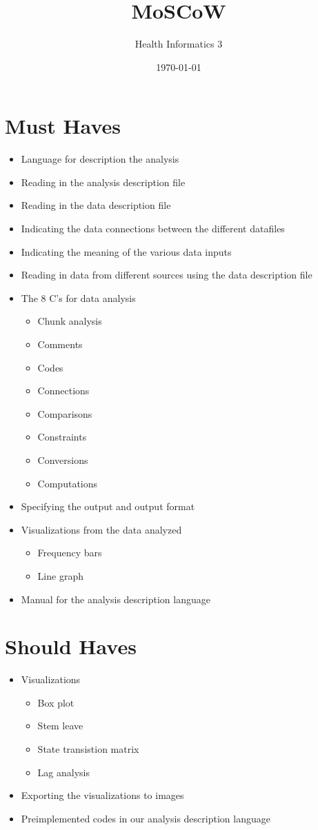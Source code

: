 \documentclass[a4paper]{article}
\title{MoSCoW}
\author{Health Informatics 3}
\date{\today}
\begin{document}
\maketitle


\section{Must Haves}
\begin{itemize}
  \item Language for description the analysis
  \item Reading in the analysis description file
  \item Reading in the data description file
  \item Indicating the data connections between the different datafiles
  \item Indicating the meaning of the various data inputs
  \item Reading in data from different sources using the data description file
  \item The 8 C's for data analysis
  \begin{itemize}
    \item Chunk analysis
    \item Comments
    \item Codes 
    \item Connections
    \item Comparisons
    \item Constraints
    \item Conversions
    \item Computations
  \end{itemize}
  \item Specifying the output and output format
  \item Visualizations from the data analyzed
  \begin{itemize}
  	\item Frequency bars
    \item Line graph
  \end{itemize}
  \item Manual for the analysis description language
\end{itemize}

\section{Should Haves}
\begin{itemize}
	\item Visualizations
    \begin{itemize}
    	\item Box plot
        \item Stem leave
        \item State transistion matrix
        \item Lag analysis
    \end{itemize}
	\item Exporting the visualizations to images
    \item Preimplemented codes in our analysis description language
\end{itemize}
\end{document}
